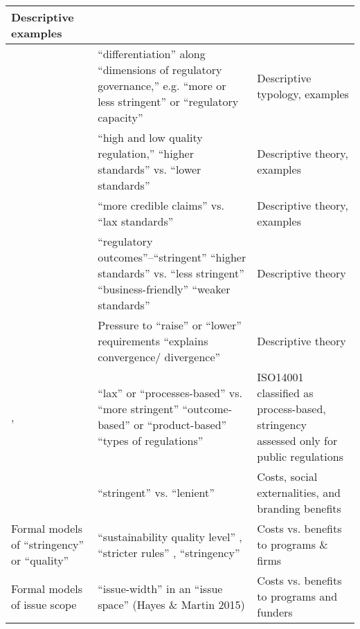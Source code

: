\begin{table}
\begin{tabular}{p{3.3cm}p{7.5cm}p{4.5cm}}
Descriptive examples\\
\hline
\citet{Eberlein2014}&
“differentiation” along “dimensions of regulatory governance,” e.g. “more or less stringent” or “regulatory capacity”&
Descriptive typology, examples\\
\hline
\citet{Hassel2008}&
“high and low quality regulation,” “higher standards” vs. “lower standards”&
Descriptive theory, examples\\
\hline
\citet{Bartley2003}&
“more credible claims” vs. “lax standards” &
Descriptive theory, examples\\
\hline
\citet{Abbott2009}&
“regulatory outcomes”--“stringent” “higher standards” vs. “less stringent” “business-friendly” “weaker standards”&
Descriptive theory\\
\hline
\citet{Bernstein2007}&
Pressure to “raise” or “lower” requirements “explains convergence/ divergence”&
Descriptive theory\\
\hline
\citet{Kollman2001}, \citet{Potoski2005} &
“lax” or “processes-based” vs. “more stringent” “outcome-based” or “product-based” “types of regulations”&
ISO14001 classified as process-based, stringency assessed only for public regulations\\
\hline
\citet{Prakash2007}&
“stringent” vs. “lenient”&
Costs, social externalities, and branding benefits\\
\hline
Formal models of “stringency” or “quality”&
“sustainability quality level” \citep{Poret2016}, “stricter rules” \citep{Schmitz2017}, “stringency” \citep{Fischer2014}&
Costs vs. benefits to programs \& firms\\
\hline
Formal models of issue scope&
“issue-width” in an “issue space” (Hayes \& Martin 2015)&
Costs vs. benefits to programs and funders
\end{tabular}

\end{table}
